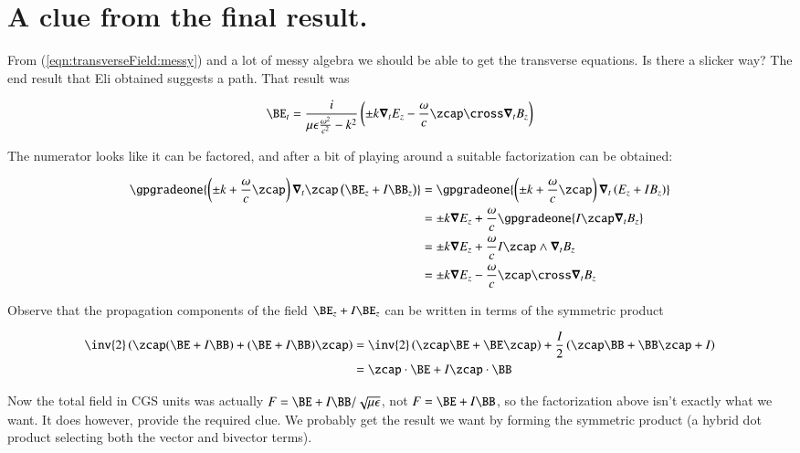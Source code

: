 \section{A clue from the final result.}

From (\ref{eqn:transverseField:messy}) and a lot of messy algebra we should be able to get the transverse equations.  Is there a slicker way?  The end result that Eli obtained suggests a path.  That result was

\begin{align}\label{eqn:transverseField:blah8}
\BE_t = \frac{i}{\mu\epsilon \frac{\omega^2}{c^2} - k^2} \left( \pm k \spacegrad_t E_z - \frac{\omega}{c} \zcap \cross \spacegrad_t B_z \right)
\end{align}

The numerator looks like it can be factored, and after a bit of playing around a suitable factorization can be obtained:

\begin{align*}
\gpgradeone{ \left( \pm k + \frac{\omega}{c} \zcap \right) \spacegrad_t \zcap \left( \BE_z + I \BB_z \right) }
&=
\gpgradeone{ \left( \pm k + \frac{\omega}{c} \zcap \right) \spacegrad_t \left( E_z + I B_z \right) } \\
&=
\pm k \spacegrad E_z + \frac{\omega}{c} \gpgradeone{ I \zcap \spacegrad_t B_z } \\
&=
\pm k \spacegrad E_z + \frac{\omega}{c} I \zcap \wedge \spacegrad_t B_z \\
&=
\pm k \spacegrad E_z - \frac{\omega}{c} \zcap \cross \spacegrad_t B_z \\
\end{align*}

Observe that the propagation components of the field $\BE_z + I\BE_z$ can be written in terms of the symmetric product

\begin{align*}
\inv{2} \left( \zcap (\BE + I\BB) + (\BE + I\BB) \zcap \right)
&=
\inv{2} \left( \zcap \BE + \BE \zcap \right) + \frac{I}{2} \left( \zcap \BB + \BB \zcap + I \right) \\
&=
\zcap \cdot \BE + I \zcap \cdot \BB
\end{align*}

Now the total field in CGS units was actually $F = \BE + I \BB/\sqrt{\mu\epsilon}$, not $F = \BE + I \BB$, so the factorization above isn't exactly what we want.   It does however, provide the required clue.  We probably get the result we want by forming the symmetric product (a hybrid dot product selecting both the vector and bivector terms).

